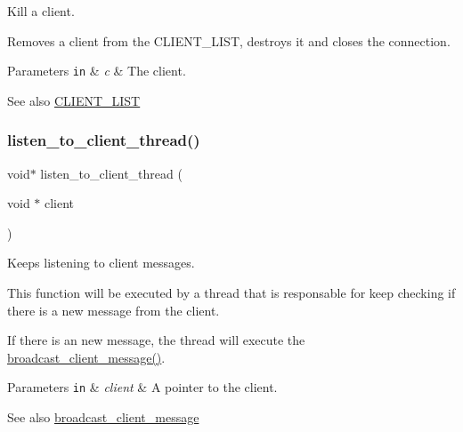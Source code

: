 Kill a client. 

Removes a client from the {\ttfamily C\+L\+I\+E\+N\+T\+\_\+\+L\+I\+ST}, destroys it and closes the connection.


\begin{DoxyParams}[1]{Parameters}
\mbox{\tt in}  & {\em c} & The client.\\
\hline
\end{DoxyParams}
\begin{DoxySeeAlso}{See also}
\hyperlink{zip-zop-server_8c_a32076dcdfaf1057a014d74d01cc7e08e}{C\+L\+I\+E\+N\+T\+\_\+\+L\+I\+ST} 
\end{DoxySeeAlso}
\mbox{\label{zip-zop-server_8c_abb42bd69f5e5088fef8519780a977f98}} 
\subsubsection{\texorpdfstring{listen\+\_\+to\+\_\+client\+\_\+thread()}{listen\_to\_client\_thread()}}
{\footnotesize\ttfamily void$\ast$ listen\+\_\+to\+\_\+client\+\_\+thread (\begin{DoxyParamCaption}\item[{void $\ast$}]{client }\end{DoxyParamCaption})}



Keeps listening to client messages. 

This function will be executed by a thread that is responsable for keep checking if there is a new message from the client.

If there is an new message, the thread will execute the \hyperlink{zip-zop-server_8c_a36e911ded647a0697ca152cae890bcf5}{broadcast\+\_\+client\+\_\+message()}.


\begin{DoxyParams}[1]{Parameters}
\mbox{\tt in}  & {\em client} & A pointer to the client.\\
\hline
\end{DoxyParams}
\begin{DoxySeeAlso}{See also}
\hyperlink{zip-zop-server_8c_a36e911ded647a0697ca152cae890bcf5}{broadcast\+\_\+client\+\_\+message} 
\end{DoxySeeAlso}
\mbox{\label{zip-zop-server_8c_a840291bc02cba5474a4cb46a9b9566fe}} 
